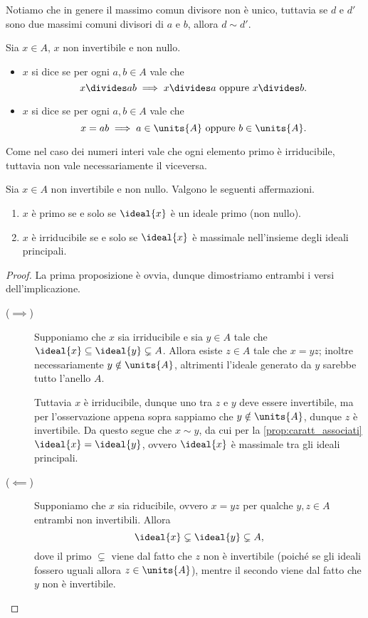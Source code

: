 Notiamo che in genere il massimo comun divisore non è unico, tuttavia se $d$ e $d'$ sono due massimi comuni divisori di $a$ e $b$, allora $d \sim d'$.

\begin{definition}
    Sia $x \in A$, $x$ non invertibile e non nullo. \begin{itemize}
        \item $x$ si dice  se per ogni $a, b \in A$ vale che \[
            x \divides ab \implies x \divides a \text{ oppure } x \divides b. 
        \]
        \item $x$ si dice  se per ogni $a, b \in A$ vale che \[
            x = ab \implies a \in \units{A} \text{ oppure } b \in \units{A}.    
        \]
    \end{itemize}
\end{definition}

Come nel caso dei numeri interi vale che ogni elemento primo è irriducibile, tuttavia non vale necessariamente il viceversa.

\begin{proposition}
    \label{prop:elems_vs_ideals}
    Sia $x \in A$ non invertibile e non nullo. Valgono le seguenti affermazioni.
    \begin{enumerate}[label={(\roman*)}]
        \item $x$ è primo se e solo se $\ideal{x}$ è un ideale primo (non nullo).
        \item $x$ è irriducibile se e solo se $\ideal{x}$ è massimale nell'insieme degli ideali principali.
    \end{enumerate}
\end{proposition}
\begin{proof}
    La prima proposizione è ovvia, dunque dimostriamo entrambi i versi dell'implicazione.

    \begin{description}
        \item[($\implies$)] Supponiamo che $x$ sia irriducibile e sia $y \in A$ tale che $\ideal{x} \subseteq \ideal{y} \subsetneq A$. Allora esiste $z \in A$ tale che $x = yz$; inoltre necessariamente $y \notin \units{A}$, altrimenti l'ideale generato da $y$ sarebbe tutto l'anello $A$.
        
        Tuttavia $x$ è irriducibile, dunque uno tra $z$ e $y$ deve essere invertibile, ma per l'osservazione appena sopra sappiamo che $y \notin \units{A}$, dunque $z$ è invertibile. Da questo segue che $x \sim y$, da cui per la \autoref{prop:caratt_associati} $\ideal{x} = \ideal{y}$, ovvero $\ideal{x}$ è massimale tra gli ideali principali.
        \item[($\impliedby$)] Supponiamo che $x$ sia riducibile, ovvero $x = yz$ per qualche $y, z \in A$ entrambi non invertibili. Allora \[
            \ideal{x} \subsetneq \ideal{y} \subsetneq A,    
        \] dove il primo $\subsetneq$ viene dal fatto che $z$ non è invertibile (poiché se gli ideali fossero uguali allora $z \in \units{A}$), mentre il secondo viene dal fatto che $y$ non è invertibile.
    \end{description}
\end{proof}